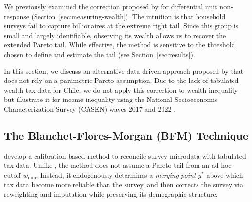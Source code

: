 We previously examined the correction proposed by \citet{vermeulen2018} for differential unit non-response (Section~\ref{sec:measuring-wealth}). The intuition is that household surveys fail to capture billionaires at the extreme right tail. Since this group is small and largely identifiable, observing its wealth allows us to recover the extended Pareto tail. While effective, the method is sensitive to the threshold chosen to define and estimate the tail (see Section~\ref{sec:results}).

In this section, we discuss an alternative data-driven approach proposed by \citet{blanchet2022weight} that does not rely on a parametric Pareto assumption. Due to the lack of tabulated wealth tax data for Chile, we do not apply this correction to wealth inequality but illustrate it for income inequality using the National Socioeconomic Characterization Survey (CASEN) waves 2017 and 2022 \citep{casen2017, casen2022}.

\subsection*{The Blanchet-Flores-Morgan (BFM) Technique}\label{sec:bfm}
\citet{blanchet2022weight} develop a calibration-based method to reconcile survey microdata with tabulated tax data. Unlike \citet{vermeulen2018}, the method does not assume a Pareto tail from an ad hoc cutoff $w_{\min}$. Instead, it endogenously determines a \textit{merging point} $y^{*}$ above which tax data become more reliable than the survey, and then corrects the survey via reweighting and imputation while preserving its demographic structure.

